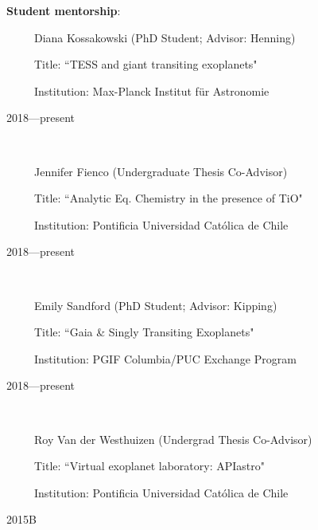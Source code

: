 \documentclass[12pt, a4paper]{article} %
\begin{document}
\begin{flushleft}%
  \setlength{\leftskip}{0.2cm}%
\textbf{Student mentorship}:

\end{flushleft}
\begin{minipage}[t]{0.6\textwidth}
\ \ \ \ \ Diana Kossakowski (PhD Student; Advisor: Henning)

\ \ \ \ \ Title:  ``TESS and giant transiting exoplanets"

\ \ \ \ \ Institution:  Max-Planck Institut f\"ur Astronomie
\end{minipage}
\begin{minipage}[t]{0.4\textwidth}
\hfill 2018---present
\end{minipage}\\
\vspace{0.2 cm}

\begin{minipage}[t]{0.6\textwidth}
\ \ \ \ \ Jennifer Fienco (Undergraduate Thesis Co-Advisor)

\ \ \ \ \ Title:  ``Analytic Eq. Chemistry in the presence of TiO"

\ \ \ \ \ Institution:  Pontificia Universidad Cat\'olica de Chile
\end{minipage}
\begin{minipage}[t]{0.4\textwidth}
\hfill 2018---present
\end{minipage}\\
\vspace{0.2 cm}

\begin{minipage}[t]{0.6\textwidth}
\ \ \ \ \ Emily Sandford (PhD Student; Advisor: Kipping)

\ \ \ \ \ Title:  ``Gaia \& Singly Transiting Exoplanets"

\ \ \ \ \ Institution:  PGIF Columbia/PUC Exchange Program
\end{minipage}
\begin{minipage}[t]{0.4\textwidth}
\hfill 2018---present
\end{minipage}\\
\vspace{0.2 cm}


\begin{minipage}[t]{0.6\textwidth}
\ \ \ \ \ Roy Van der Westhuizen (Undergrad Thesis Co-Advisor)

\ \ \ \ \ Title: ``Virtual exoplanet laboratory: APIastro"

\ \ \ \ \ Institution:  Pontificia Universidad Cat\'olica de Chile
\end{minipage}
\begin{minipage}[t]{0.4\textwidth}
\hfill 2015B
\end{minipage}
\end{document}
